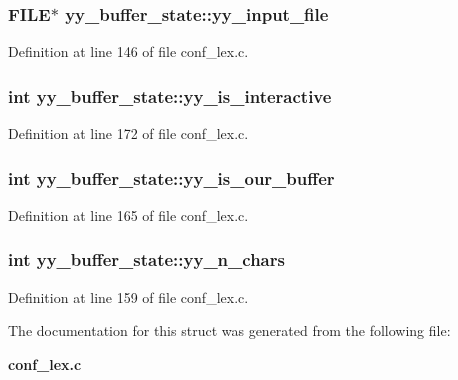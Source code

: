 \subsubsection{\setlength{\rightskip}{0pt plus 5cm}FILE$\ast$ {\bf yy\_\-buffer\_\-state::yy\_\-input\_\-file}}\label{structyy__buffer__state_o0}




Definition at line 146 of file conf\_\-lex.c.
\subsubsection{\setlength{\rightskip}{0pt plus 5cm}int {\bf yy\_\-buffer\_\-state::yy\_\-is\_\-interactive}}\label{structyy__buffer__state_o6}




Definition at line 172 of file conf\_\-lex.c.
\subsubsection{\setlength{\rightskip}{0pt plus 5cm}int {\bf yy\_\-buffer\_\-state::yy\_\-is\_\-our\_\-buffer}}\label{structyy__buffer__state_o5}




Definition at line 165 of file conf\_\-lex.c.
\subsubsection{\setlength{\rightskip}{0pt plus 5cm}int {\bf yy\_\-buffer\_\-state::yy\_\-n\_\-chars}}\label{structyy__buffer__state_o4}




Definition at line 159 of file conf\_\-lex.c.

The documentation for this struct was generated from the following file:\begin{CompactItemize}
\item 
{\bf conf\_\-lex.c}\end{CompactItemize}
